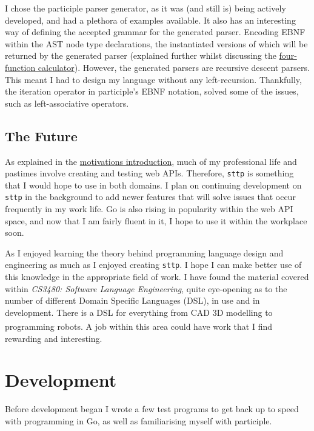 \documentclass[]{full}
\theoremstyle{definition}
\begin{document}
I chose the participle parser generator, as it was (and still is) being actively developed, and had a plethora of examples available. It also has an interesting way of defining the accepted grammar for the generated parser. Encoding EBNF within the AST node type declarations, the instantiated versions of which will be returned by the generated parser (explained further whilst discussing the \hyperref[sec:four-function-calc]{four-function calculator}). However, the generated parsers are recursive descent parsers. This meant I had to design my language without any left-recursion. Thankfully, the iteration operator in participle's EBNF notation, solved some of the issues, such as left-associative operators.

\section{The Future}

As explained in the \hyperref[chap:motivations]{motivations introduction}, much of my professional life and pastimes involve creating and testing web APIs. Therefore, \verb|sttp| is something that I would hope to use in both domains. I plan on continuing development on \verb|sttp| in the background to add newer features that will solve issues that occur frequently in my work life. Go is also rising in popularity within the web API space, and now that I am fairly fluent in it, I hope to use it within the workplace soon.

As I enjoyed learning the theory behind programming language design and engineering as much as I enjoyed creating \verb|sttp|. I hope I can make better use of this knowledge in the appropriate field of work. I have found the material covered within \textit{CS3480: Software Language Engineering}, quite eye-opening as to the number of different Domain Specific Languages (DSL), in use and in development. There is a DSL for everything from CAD 3D modelling to programming robots\textsuperscript{\cite{nordmann_hochgeschwender_wrede_2014}}. A job within this area could have work that I find rewarding and interesting.

\chapter{Development}
\label{chap:development}

Before development began I wrote a few test programs to get back up to speed with programming in Go, as well as familiarising myself with participle.
\end{document}
